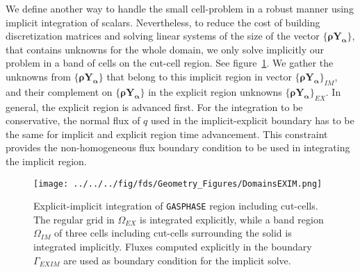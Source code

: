 We define another way to handle the small cell-problem in a robust manner using implicit integration of scalars. Nevertheless, to reduce the cost of building discretization matrices and solving linear systems of the size of the vector $\{\mathbf{\rho Y_\alpha}\}$, that contains unknowns for the whole domain, we only solve implicitly our problem in a band of cells on the cut-cell region. See figure~\ref{Fig:DOMEXIM}. We gather the unknowns from  $\{\mathbf{\rho Y_\alpha}\}$ that belong to this implicit region in vector $\{\mathbf{\rho Y_\alpha}\}_{IM}$, and their complement on $\{\mathbf{\rho Y_\alpha}\}$ in the explicit region unknowns $\{\mathbf{\rho Y_\alpha}\}_{EX}$. In general, the explicit region is advanced first. For the integration to be conservative, the normal flux of $q$ used in the implicit-explicit boundary has to be the same for implicit and explicit region time advancement. This constraint provides the non-homogeneous flux boundary condition to be used in integrating the implicit region.

%
\begin{figure}[h]
      \centering
      \texttt{[image: ../../../fig/fds/Geometry\_Figures/DomainsEXIM.png]}
      \caption{Explicit-implicit integration of \texttt{GASPHASE} region including cut-cells. The regular grid in $\Omega_{EX}$ is integrated explicitly, while a band region $\Omega_{IM}$ of three cells including cut-cells surrounding the solid is integrated implicitly. Fluxes computed explicitly in the boundary $\Gamma_{EXIM}$ are used as boundary condition for the implicit solve.}
	\label{Fig:DOMEXIM}
\end{figure}
%

